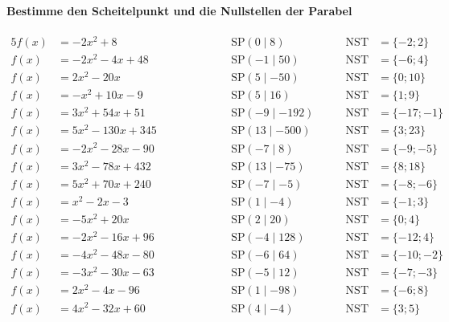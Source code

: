 \documentclass
[
  draft    = true,
  fontsize = 11pt,
  parskip  = half-,
  BCOR     = 0pt,
  DIV      = 11
]
{scrartcl}
\begin{document}
\paragraph{Bestimme den Scheitelpunkt und die Nullstellen der Parabel}
\begin{alignat*}{5}
  f(x)&=-2x^{2}+8 \qquad&\qquad \quad&\text{SP}(0\mid8) \quad&\quad \text{NST}&=\{-2;2\} \\[0.5ex]
  f(x)&=-2x^{2}-4x+48 \qquad&\qquad \quad&\text{SP}(-1\mid50) \quad&\quad \text{NST}&=\{-6;4\} \\[0.5ex]
  f(x)&=2x^{2}-20x \qquad&\qquad \quad&\text{SP}(5\mid-50) \quad&\quad \text{NST}&=\{0;10\} \\[0.5ex]
  f(x)&=-x^{2}+10x-9 \qquad&\qquad \quad&\text{SP}(5\mid16) \quad&\quad \text{NST}&=\{1;9\} \\[0.5ex]
  f(x)&=3x^{2}+54x+51 \qquad&\qquad \quad&\text{SP}(-9\mid-192) \quad&\quad \text{NST}&=\{-17;-1\} \\[0.5ex]
  f(x)&=5x^{2}-130x+345 \qquad&\qquad \quad&\text{SP}(13\mid-500) \quad&\quad \text{NST}&=\{3;23\} \\[0.5ex]
  f(x)&=-2x^{2}-28x-90 \qquad&\qquad \quad&\text{SP}(-7\mid8) \quad&\quad \text{NST}&=\{-9;-5\} \\[0.5ex]
  f(x)&=3x^{2}-78x+432 \qquad&\qquad \quad&\text{SP}(13\mid-75) \quad&\quad \text{NST}&=\{8;18\} \\[0.5ex]
  f(x)&=5x^{2}+70x+240 \qquad&\qquad \quad&\text{SP}(-7\mid-5) \quad&\quad \text{NST}&=\{-8;-6\} \\[0.5ex]
  f(x)&=x^{2}-2x-3 \qquad&\qquad \quad&\text{SP}(1\mid-4) \quad&\quad \text{NST}&=\{-1;3\} \\[0.5ex]
  f(x)&=-5x^{2}+20x \qquad&\qquad \quad&\text{SP}(2\mid20) \quad&\quad \text{NST}&=\{0;4\} \\[0.5ex]
  f(x)&=-2x^{2}-16x+96 \qquad&\qquad \quad&\text{SP}(-4\mid128) \quad&\quad \text{NST}&=\{-12;4\} \\[0.5ex]
  f(x)&=-4x^{2}-48x-80 \qquad&\qquad \quad&\text{SP}(-6\mid64) \quad&\quad \text{NST}&=\{-10;-2\} \\[0.5ex]
  f(x)&=-3x^{2}-30x-63 \qquad&\qquad \quad&\text{SP}(-5\mid12) \quad&\quad \text{NST}&=\{-7;-3\} \\[0.5ex]
  f(x)&=2x^{2}-4x-96 \qquad&\qquad \quad&\text{SP}(1\mid-98) \quad&\quad \text{NST}&=\{-6;8\} \\[0.5ex]
  f(x)&=4x^{2}-32x+60 \qquad&\qquad \quad&\text{SP}(4\mid-4) \quad&\quad \text{NST}&=\{3;5\} \\[0.5ex]

\end{alignat*}
\end{document}
